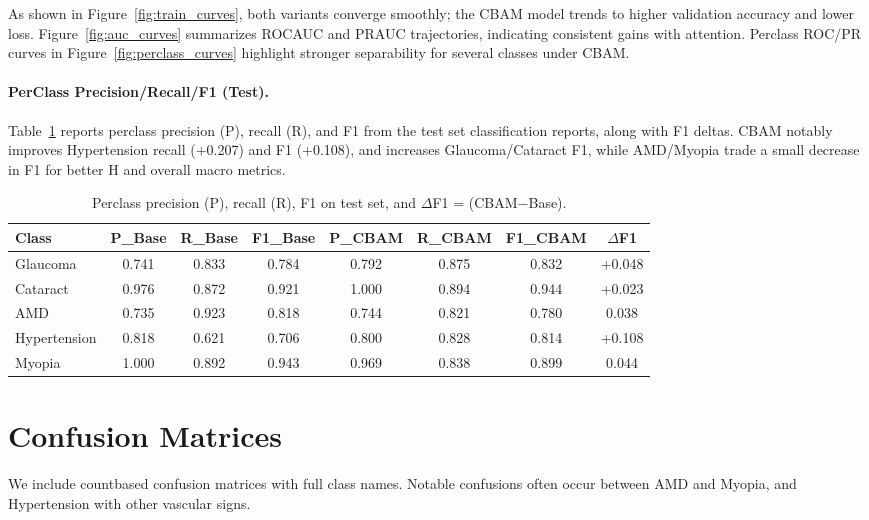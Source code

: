 As shown in Figure~\ref{fig:train_curves}, both variants converge smoothly; the CBAM model trends to higher validation accuracy and lower loss. Figure~\ref{fig:auc_curves} summarizes ROC\textendash AUC and PR\textendash AUC trajectories, indicating consistent gains with attention. Per\textendash class ROC/PR curves in Figure~\ref{fig:perclass_curves} highlight stronger separability for several classes under CBAM.

\paragraph{Per\textendash Class Precision/Recall/F1 (Test).}
Table~\ref{tab:perclass_report} reports per\textendash class precision (P), recall (R), and F1 from the test set classification reports, along with F1 deltas. CBAM notably improves Hypertension recall (+0.207) and F1 (+0.108), and increases Glaucoma/Cataract F1, while AMD/Myopia trade a small decrease in F1 for better H and overall macro metrics.

\begin{table}[t]
  \centering
  \caption{Per\textendash class precision (P), recall (R), F1 on test set, and $\Delta$F1 = (CBAM$-$Base).}
  \label{tab:perclass_report}
  \begin{tabular}{lccccccc}
    \toprule
    Class & P\_Base & R\_Base & F1\_Base & P\_CBAM & R\_CBAM & F1\_CBAM & $\Delta$F1 \\
    \midrule
    Glaucoma & 0.741 & 0.833 & 0.784 & 0.792 & 0.875 & 0.832 & +0.048 \\
    Cataract & 0.976 & 0.872 & 0.921 & 1.000 & 0.894 & 0.944 & +0.023 \\
    AMD & 0.735 & 0.923 & 0.818 & 0.744 & 0.821 & 0.780 & \textminus{}0.038 \\
    Hypertension & 0.818 & 0.621 & 0.706 & 0.800 & 0.828 & 0.814 & +0.108 \\
    Myopia & 1.000 & 0.892 & 0.943 & 0.969 & 0.838 & 0.899 & \textminus{}0.044 \\
    \bottomrule
  \end{tabular}
\end{table}

\section{Confusion Matrices}
We include count\textendash based confusion matrices with full class names. Notable confusions often occur between AMD and Myopia, and Hypertension with other vascular signs.

